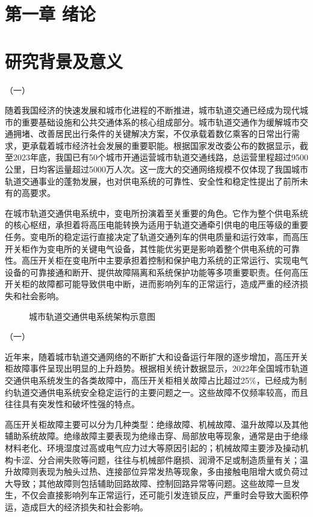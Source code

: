 \section{第一章 绪论}

\section{研究背景及意义}

（一）

随着我国经济的快速发展和城市化进程的不断推进，城市轨道交通已经成为现代城市的重要基础设施和公共交通体系的核心组成部分。城市轨道交通作为缓解城市交通拥堵、改善居民出行条件的关键解决方案，不仅承载着数亿乘客的日常出行需求，更承载着城市经济社会发展的重要职能。根据国家发改委公布的数据显示，截至2023年底，我国已有50个城市开通运营城市轨道交通线路，总运营里程超过9500公里，日均客运量超过5000万人次。这一庞大的交通网络规模不仅体现了我国城市轨道交通事业的蓬勃发展，也对供电系统的可靠性、安全性和稳定性提出了前所未有的高要求。

在城市轨道交通供电系统中，变电所扮演着至关重要的角色。它作为整个供电系统的核心枢纽，承担着将高压电能转换为适用于轨道交通牵引供电的电压等级的重要任务。变电所的稳定运行直接决定了轨道交通列车的供电质量和运行效率，而高压开关柜作为变电所的关键电气设备，其性能优劣更是影响着整个供电系统的可靠性。高压开关柜在变电所中主要承担着控制和保护电力系统的正常运行、实现电气设备的可靠接通和断开、提供故障隔离和系统保护功能等多项重要职责。任何高压开关柜的故障都可能导致供电中断，进而影响列车的正常运行，造成严重的经济损失和社会影响。

\begin{figure}[h]
\centering
\caption{城市轨道交通供电系统架构示意图}
\label{fig:railway_power_system}
\end{figure}

（一）

近年来，随着城市轨道交通网络的不断扩大和设备运行年限的逐步增加，高压开关柜故障事件呈现出明显的上升趋势。根据相关统计数据显示，2022年全国城市轨道交通供电系统发生的各类故障中，高压开关柜相关故障占比超过25\%，已经成为制约轨道交通供电系统安全稳定运行的主要问题之一。这些故障不仅频率较高，而且往往具有突发性和破坏性强的特点。

高压开关柜故障主要可以分为几种类型：绝缘故障、机械故障、温升故障以及其他辅助系统故障。绝缘故障主要表现为绝缘击穿、局部放电等现象，通常是由于绝缘材料老化、环境湿度过高或电气应力过大等原因引起的；机械故障主要涉及操动机构卡涩、分合闸失败等问题，往往与机械部件磨损、润滑不足或制造质量有关；温升故障则表现为触头过热、连接部位异常发热等现象，多由接触电阻增大或负荷过大导致；其他故障则包括辅助回路故障、控制回路异常等问题。这些故障一旦发生，不仅会直接影响列车正常运行，还可能引发连锁反应，严重时会导致大面积停运，造成巨大的经济损失和社会影响。

